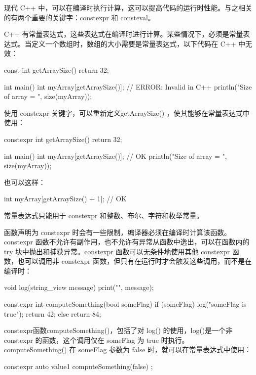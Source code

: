 
现代 C++ 中，可以在编译时执行计算，这可以提高代码的运行时性能。与之相关的有两个重要的关键字：constexpr 和 consteval。


C++ 有常量表达式，这些表达式在编译时进行计算。某些情况下，必须是常量表达式。当定义一个数组时，数组的大小需要是常量表达式，以下代码在 C++ 中无效：

\begin{cpp}
const int getArraySize() { return 32; }

int main()
{
    int myArray[getArraySize()]; // ERROR: Invalid in C++
    println("Size of array = {}", size(myArray));
}
\end{cpp}

使用 constexpr 关键字，可以重新定义getArraySize() ，使其能够在常量表达式中使用：

\begin{cpp}
constexpr int getArraySize() { return 32; }

int main()
{
    int myArray[getArraySize()]; // OK
    println("Size of array = {}", size(myArray));
}
\end{cpp}

也可以这样：

\begin{cpp}
int myArray[getArraySize() + 1]; // OK
\end{cpp}

常量表达式只能用于 constexpr 和整数、布尔、字符和枚举常量。

函数声明为 constexpr 时会有一些限制，编译器必须在编译时计算该函数。constexpr 函数不允许有副作用，也不允许有异常从函数中逸出，可以在函数内的 try 块中抛出和捕获异常。constexpr 函数可以无条件地使用其他 constexpr 函数，也可以调用非 constexpr 函数，但只有在运行时才会触发这些调用，而不是在编译时：

\begin{cpp}
void log(string_view message) { print("{}", message); }

constexpr int computeSomething(bool someFlag)
{
    if (someFlag) {
        log("someFlag is true");
        return 42;
    }
    else { return 84; }
}
\end{cpp}

constexpr函数computeSomething()，包括了对 log() 的使用，log()是一个非 constexpr 的函数，这个调用仅在 someFlag 为 true 时执行。 computeSomething() 在 someFlag 参数为 false 时，就可以在常量表达式中使用：

\begin{cpp}
constexpr auto value1 { computeSomething(false) };
\end{cpp}

